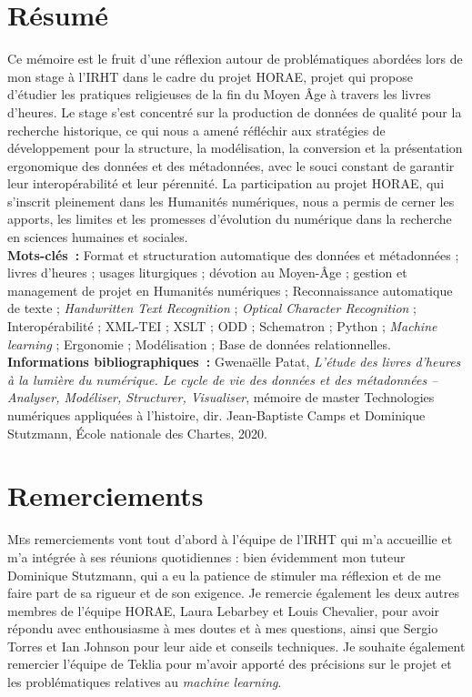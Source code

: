 \documentclass[a4paper,12pt,twoside]{book}
\begin{document}
	\chapter*{Résumé}
	\medskip
	Ce mémoire est le fruit d'une réflexion autour de problématiques abordées lors de mon stage à l'IRHT dans le cadre du projet HORAE, projet qui propose d'étudier les pratiques religieuses de la fin du Moyen Âge à travers les livres d'heures. Le stage s'est concentré sur la production de données de qualité pour la recherche historique, ce qui nous a amené réfléchir aux stratégies de développement pour la structure, la modélisation, la conversion et la présentation ergonomique des données et des métadonnées, avec le souci constant de garantir leur interopérabilité et leur pérennité. La participation au projet HORAE, qui s'inscrit pleinement dans les Humanités numériques, nous a permis de cerner les apports, les limites et les promesses d'évolution du numérique dans la recherche en sciences humaines et sociales.\\
	
	\textbf{Mots-clés~:} Format et structuration automatique des données et métadonnées ; livres d'heures ; usages liturgiques ; dévotion au Moyen-Âge ; gestion et management de projet en Humanités numériques ; Reconnaissance automatique de texte ; \textit{Handwritten Text Recognition} ; \textit{Optical Character Recognition} ; Interopérabilité ; XML-TEI ; XSLT ; ODD ; Schematron ; Python ; \textit{Machine learning} ; Ergonomie ; Modélisation ; Base de données relationnelles.\\
	
	\textbf{Informations bibliographiques~:} Gwenaëlle Patat, \textit{L’étude des livres d’heures à la lumière du numérique. Le cycle de vie des données et des métadonnées – Analyser, Modéliser, Structurer, Visualiser}, mémoire de master \og{}Technologies numériques appliquées à l'histoire\fg{}, dir. Jean-Baptiste Camps et Dominique Stutzmann, École nationale des Chartes, 2020.
	
	\chapter*{Remerciements}
	
	\lettrine{M}es remerciements vont tout d'abord à l'équipe de l'IRHT qui m'a accueillie et m'a intégrée à ses réunions quotidiennes : bien évidemment mon tuteur Dominique Stutzmann, qui a eu la patience de stimuler ma réflexion et de me faire part de sa rigueur et de son exigence. Je remercie également les deux autres membres de l'équipe HORAE, Laura Lebarbey et Louis Chevalier, pour avoir répondu avec enthousiasme à mes doutes et à mes questions, ainsi que Sergio Torres et Ian Johnson pour leur aide et conseils techniques. Je souhaite également remercier l'équipe de Teklia pour m'avoir apporté des précisions sur le projet et les problématiques relatives au \textit{machine learning}.\\
	
\end{document}
